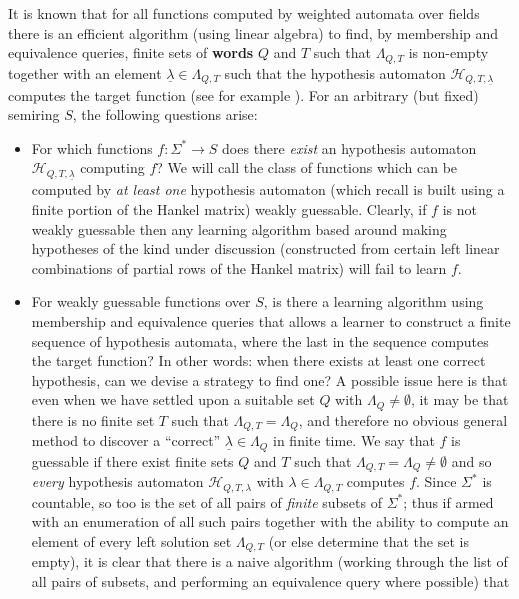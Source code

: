 \documentclass[10pt,a4paper]{amsart}
\theoremstyle{definition}
\numberwithin{equation}{section}
\numberwithin{theorem}{section}
\begin{document}
It is known that for all functions computed by weighted automata over fields there is an efficient algorithm (using linear algebra) to find, by membership and equivalence queries, finite
sets of \textbf{words}
$Q$ and $T$ such that
$\Lambda_{Q,T}$ is non-empty
together with an  element 
$\underline{\lambda}
\in \Lambda_{Q,T}$  such that the hypothesis automaton $\mathcal{H}_{Q,T,\underline{\lambda}}$ computes the target function (see for example \cite{BV96}). For an arbitrary (but fixed) semiring $S$, the following questions arise:
\begin{itemize}
\item For which functions $f: \Sigma^* \rightarrow S$ does there \emph{exist} an hypothesis automaton $\mathcal{H}_{Q, T, \underline{\lambda}}$ computing $f$? We will call the class of functions which can be computed by \emph{at least one} hypothesis automaton (which recall is built using a finite portion of the Hankel matrix) weakly guessable. Clearly, if $f$ is not weakly guessable then any learning algorithm based around making hypotheses of the kind under discussion (constructed from certain left linear combinations of partial rows of the Hankel matrix) will fail to learn $f$. 
\item For weakly guessable functions over $S$, is there a learning algorithm using membership and equivalence queries that allows a learner to construct a finite sequence of hypothesis automata, where the last in the sequence computes the target function?
In other words: when there exists at least one correct hypothesis, can we devise a strategy to find one? A possible issue here is that even when we have settled upon a suitable set $Q$ with $\Lambda_Q \neq \emptyset$, it may be that there is no finite set $T$ such that $\Lambda_{Q, T}= \Lambda_Q$, and therefore no obvious general method to discover a ``correct'' $\underline{\lambda} \in \Lambda_Q$  in finite time. We say that $f$ is guessable if there exist finite sets $Q$ and $T$ such that $\Lambda_{Q,T} = \Lambda_Q \neq \emptyset$ and so \emph{every} hypothesis automaton $\mathcal{H}_{Q, T, \lambda}$ with $\lambda \in \Lambda_{Q,T}$ computes $f$. Since $\Sigma^*$ is countable,
so too is the set of all pairs of \emph{finite} subsets of $\Sigma^*$; thus if armed with an enumeration of all such pairs together with the ability to compute an element of every left solution set $\Lambda_{Q,T}$  (or else determine that the set is empty), it is clear that there is a naive algorithm (working through the list of all pairs of subsets, and performing an equivalence query where possible) that

\end{itemize}
\end{document}
